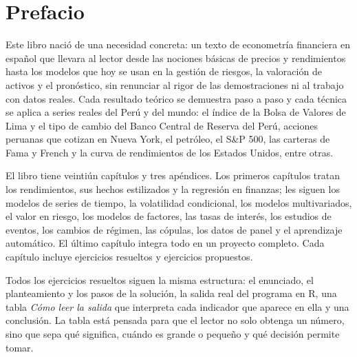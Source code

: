 \chapter*{Prefacio}

Este libro nació de una necesidad concreta: un texto de econometría financiera en español que llevara al
lector desde las nociones básicas de precios y rendimientos hasta los modelos que hoy se usan en la gestión
de riesgos, la valoración de activos y el pronóstico, sin renunciar al rigor de las demostraciones ni al
trabajo con datos reales. Cada resultado teórico se demuestra paso a paso y cada técnica se aplica a series
reales del Perú y del mundo: el índice de la Bolsa de Valores de Lima y el tipo de cambio del Banco Central
de Reserva del Perú, acciones peruanas que cotizan en Nueva York, el petróleo, el S\&P 500, las carteras de
Fama y French y la curva de rendimientos de los Estados Unidos, entre otras.

El libro tiene veintiún capítulos y tres apéndices. Los primeros capítulos tratan los rendimientos, sus
hechos estilizados y la regresión en finanzas; les siguen los modelos de series de tiempo, la volatilidad
condicional, los modelos multivariados, el valor en riesgo, los modelos de factores, las tasas de interés,
los estudios de eventos, los cambios de régimen, las cópulas, los datos de panel y el aprendizaje
automático. El último capítulo integra todo en un proyecto completo. Cada capítulo incluye ejercicios
resueltos y ejercicios propuestos.

Todos los ejercicios resueltos siguen la misma estructura: el enunciado, el planteamiento y los pasos de
la solución, la salida real del programa en R, una tabla \emph{Cómo leer la salida} que interpreta cada
indicador que aparece en ella y una conclusión. La tabla está pensada para que el lector no solo obtenga
un número, sino que sepa qué significa, cuándo es grande o pequeño y qué decisión permite tomar.

